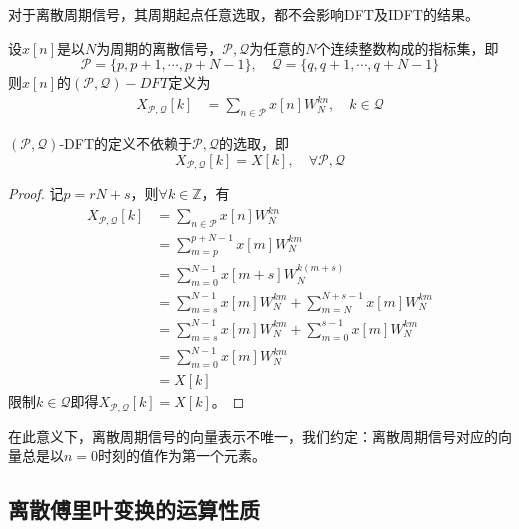 对于离散周期信号，其周期起点任意选取，都不会影响DFT及IDFT的结果。
\begin{definition}
    设$x[n]$是以$N$为周期的离散信号，$\mathcal{P} ,\mathcal{Q} $为任意的$N$个连续整数构成的指标集，即
    \[\mathcal{P} =\{p,p+1,\cdots,p+N-1\},\quad \mathcal{Q} =\{q,q+1,\cdots,q+N-1\}\]
    则$x[n]$的$(\mathcal{P} ,\mathcal{Q} )-DFT$定义为
    \begin{align*}
    X_{\mathcal{P} ,\mathcal{Q} }[k]&=\sum_{n\in\mathcal{P} }x[n]W_N^{kn},\quad k\in\mathcal{Q}
    \end{align*}
\end{definition}
\begin{proposition}
    $(\mathcal{P} ,\mathcal{Q} )$-DFT的定义不依赖于$\mathcal{P} ,\mathcal{Q} $的选取，即
    \[X_{\mathcal{P} ,\mathcal{Q} }[k]=X[k],\quad \forall \mathcal{P} ,\mathcal{Q} \]
\end{proposition}
\begin{proof}
    记$p=rN+s$，则$\forall k\in\mathbb{Z}$，有\begin{align*}
    X_{\mathcal{P} ,\mathcal{Q} }[k]&=\sum_{n\in\mathcal{P} }x[n]W_N^{kn}\\
    &=\sum_{m=p}^{p+N-1}x[m]W_N^{km}\\
    &=\sum_{m=0}^{N-1}x[m+s]W_N^{k(m+s)}\\
    &=\sum_{m=s}^{N-1}x[m]W_N^{km}+\sum_{m=N}^{N+s-1}x[m]W_N^{km}\\
    &=\sum_{m=s}^{N-1}x[m]W_N^{km}+\sum_{m=0}^{s-1}x[m]W_N^{km}\\
    &=\sum_{m=0}^{N-1}x[m]W_N^{km}\\
    &=X[k]
    \end{align*}
    限制$k\in\mathcal{Q} $即得$X_{\mathcal{P} ,\mathcal{Q} }[k]=X[k]$。
\end{proof}

在此意义下，离散周期信号的向量表示不唯一，我们约定：离散周期信号对应的向量总是以$n=0$时刻的值作为第一个元素。

\subsection{离散傅里叶变换的运算性质}\label{sub:property_of_DFT}

